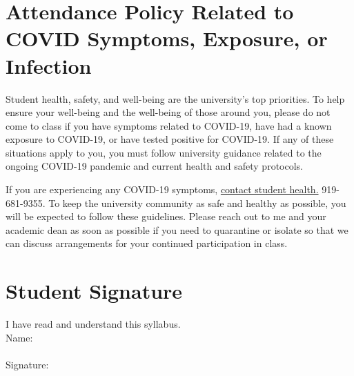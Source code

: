 \documentclass[12pt]{article}
\begin{document}
\section{Attendance Policy Related to COVID Symptoms, Exposure, or Infection}

Student health, safety, and well-being are the university's top priorities. To help ensure your well-being and the well-being of those around you, please do not come to class if you have symptoms related to COVID-19, have had a known exposure to COVID-19, or have tested positive for COVID-19. If any of these situations apply to you, you must follow university guidance related to the ongoing COVID-19 pandemic and current health and safety protocols.  

If you are experiencing any COVID-19 symptoms, \href{https://coronavirus.duke.edu/if-you-feel-sick/}{contact student health.} 919-681-9355. To keep the university community as safe and healthy as possible, you will be expected to follow these guidelines. Please reach out to me and your academic dean as soon as possible if you need to quarantine or isolate so that we can discuss arrangements for your continued participation in class.  

\section{Student Signature}

I have read and understand this syllabus. \\


Name: \\
\vspace{2cm}\\
Signature:
\end{document}
